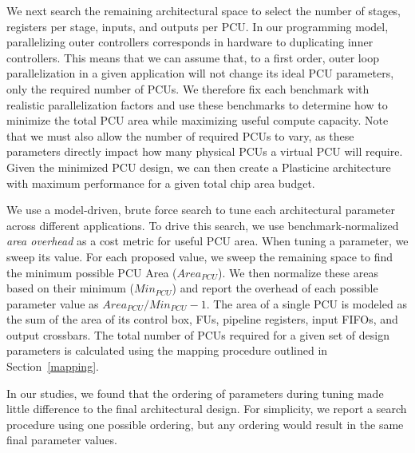 We next search the remaining architectural space to select the number of stages, registers per stage, inputs, and outputs per PCU.
In our programming model, parallelizing outer controllers corresponds in hardware to duplicating inner controllers.
This means that we can assume that, to a first order, outer loop parallelization in a given application will not change its ideal
PCU parameters, only the required number of PCUs. We therefore fix each benchmark with realistic parallelization factors and use
these benchmarks to determine how to minimize the total PCU area while maximizing useful compute capacity.
Note that we must also allow the number of required PCUs to vary, as these parameters directly impact how many physical PCUs a virtual PCU will require.
Given the minimized PCU design, we can then create a Plasticine architecture with maximum performance for a given total chip area budget.




We use a model-driven, brute force search to tune each architectural parameter across different applications.
To drive this search, we use benchmark-normalized \emph{area overhead} as a cost metric for useful PCU area.
When tuning a parameter, we sweep its value. For each proposed value, we sweep the remaining space to find the minimum possible PCU Area ($Area_{PCU}$).
We then normalize these areas based on their minimum ($Min_{PCU}$) and report the overhead of each possible parameter value as $Area_{PCU}/Min_{PCU} - 1$.
The area of a single PCU is modeled as the sum of the area of its control box, FUs, pipeline
registers, input FIFOs, and output crossbars.
The total number of PCUs required for a given set of design parameters is calculated using the mapping procedure outlined in Section~\ref{mapping}. 

In our studies, we found that the ordering of parameters during tuning made little difference to the final architectural design. 
For simplicity, we report a search procedure using one possible ordering, but any ordering would result in the same final parameter values.

